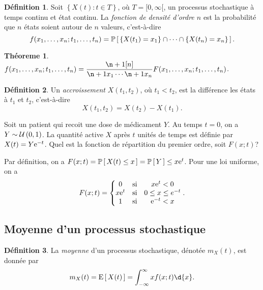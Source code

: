 \documentclass[11pt]{article}
\makeatletter
\renewcommand\P[1]{%
	\ensuremath{%
		\mathbb{P}\left[\,#1\,\right]%
	}%
}%
\newcommand\e{%
	\ensuremath{%
		\mathrm{e}%
	}%
}%
\newcommand\Uni[2]{%
	\ensuremath{%
		\mathcal{U}\left(#1,#2\right)%
	}%
}%
\newcommand\Esp[1]{%
	\ensuremath{%
		\mathrm{E}\left[\,#1\,\right]%
	}%
}%
\newtheorem{theoreme}{Théoreme}[section]
\theoremstyle{remark}
\theoremstyle{definition}
\newtheorem*{@definition}{Définition}
\newenvironment{definition}{%
	\begin{@definition}%
}{%
	\end{@definition}%
	\setcounter{property}{0}%
}
\makeatother
\begin{document}
\begin{definition}
	Soit $\left\{X(t):t\in T\right\}$, où $T=[0,\infty[$, un processus
	stochastique à temps continu et état continu. La \textit{fonction de
	densité d'ordre $n$} est la probabilité que $n$ états soient autour de $n$
	valeurs, c'est-à-dire
	\begin{equation*}
		f(x_1,\dots,x_n;t_1,\dots,t_n)
		=\P{\left\{X(t_1)=x_1\right\}
		 \cap\cdots\cap
		 \left\{X(t_n)=x_n\right\}}.
	\end{equation*}
\end{definition}

\begin{theoreme}
	$f(x_1,\dots,x_n;t_1,\dots,t_n)=\dfrac{\p[n]{}}{\p{x_1}\cdots\p{x_n}}
	F(x_1,\dots,x_n;t_1,\dots,t_n)$.
\end{theoreme}

\begin{definition}
	Un \textit{accroissement} $X(t_1,t_2)$, où $t_1<t_2$, est la différence
	les états à $t_1$ et $t_2$, c'est-à-dire
	\begin{equation*}
		X(t_1,t_2)=X(t_2)-X(t_1).
	\end{equation*}
\end{definition}

\pagebreak
\begin{exemple}
	Soit un patient qui recoit une dose de médicament $Y$. Au temps $t=0$, on
	a $Y\sim\Uni{0}{1}$. La quantité active $X$ après $t$ unités de temps est
	définie par $X(t)=Y\e^{-t}$. Quel est la fonction de répartition du
	premier ordre, soit $F(x;t)$?

	Par définition, on a $F(x;t)=\P{X(t)\leq x}=\P{Y}\leq x\e^t$. Pour une loi
	uniforme, on a
	\begin{equation*}
		F(x;t)=\left\{
			\begin{matrix}
				0     &\text{si}& x\e^t<0\\
				x\e^t &\text{si}& 0\leq x\leq e^{-t}\\
				1     &\text{si}& \e^{-t}<x\\
			\end{matrix}
		\right..
	\end{equation*}
\end{exemple}

\subsection{Moyenne d'un processus stochastique}
\begin{definition}
	La \textit{moyenne} d'un processus stochastique, dénotée $m_X(t)$, est
	donnée par
	\begin{equation*}
		m_X(t)=\Esp{X(t)}=\int_{-\infty}^\infty xf(x;t)\d{x}.
	\end{equation*}
\end{definition}
\end{document}
